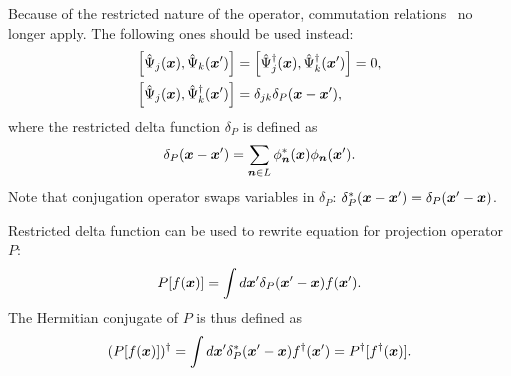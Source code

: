 Because of the restricted nature of the operator, commutation relations~ no longer apply.
The following ones should be used instead:
\begin{equation}
\label{eqn:multimode-formalism:restricted-commutators}
\begin{split}
	\left[ \hat{\Psi}_{j}(\boldsymbol{x}), \hat{\Psi}_{k}(\boldsymbol{x}^\prime) \right]
	& = \left[ \hat{\Psi}_{j}^\dagger(\boldsymbol{x}), \hat{\Psi}_{k}^\dagger(\boldsymbol{x}^\prime) \right] = 0, \\
	\left[ \hat{\Psi}_{j}(\boldsymbol{x}), \hat{\Psi}_{k}^\dagger(\boldsymbol{x}^\prime) \right]
	& = \delta_{jk} \delta_P(\boldsymbol{x} - \boldsymbol{x}^\prime),
\end{split}
\end{equation}
where the restricted delta function $\delta_P$ is defined as
\begin{equation}
\label{eqn:multimode-formalism:restricted-delta}
	\delta_P(\boldsymbol{x} - \boldsymbol{x}^\prime)
	= \sum\limits_{\boldsymbol{n} \in L} \phi_{\boldsymbol{n}}^* (\boldsymbol{x}) \phi_{\boldsymbol{n}} (\boldsymbol{x}^\prime).
\end{equation}
Note that conjugation operator swaps variables in $\delta_P$: $\delta_P^*(\boldsymbol{x} - \boldsymbol{x}^\prime) = \delta_P(\boldsymbol{x}^\prime - \boldsymbol{x})$.

Restricted delta function can be used to rewrite equation for projection operator $P$:
\[
	P [f(\boldsymbol{x})] = \int d\boldsymbol{x}^\prime \delta_P(\boldsymbol{x}^\prime - \boldsymbol{x}) f(\boldsymbol{x}^\prime).
\]
The Hermitian conjugate of $P$ is thus defined as
\[
	(P [f(\boldsymbol{x})])^\dagger
	= \int d\boldsymbol{x}^\prime \delta_P^*(\boldsymbol{x}^\prime - \boldsymbol{x}) f^\dagger(\boldsymbol{x}^\prime)
	= P^\dagger [f^\dagger(\boldsymbol{x})].
\]
